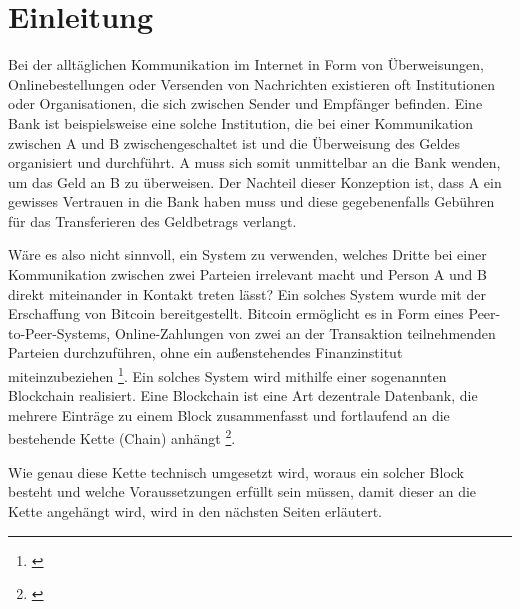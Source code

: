 \chapter*{Einleitung}

 Bei der alltäglichen Kommunikation im Internet in Form von 
 Überweisungen, Onlinebestellungen oder Versenden von Nachrichten 
 existieren oft Institutionen oder Organisationen, die sich
 zwischen Sender und Empfänger befinden. Eine Bank ist beispielsweise eine solche Institution, die bei einer Kommunikation zwischen A und B zwischengeschaltet ist und die Überweisung des Geldes organisiert und durchführt. A muss sich somit unmittelbar an die Bank wenden, um das Geld an B zu überweisen. Der Nachteil dieser Konzeption ist, dass A ein gewisses Vertrauen in die Bank haben muss und diese gegebenenfalls Gebühren für das Transferieren des Geldbetrags verlangt. 

 Wäre es also nicht sinnvoll, ein System zu verwenden, welches Dritte bei einer Kommunikation zwischen zwei Parteien irrelevant macht und Person A und B direkt miteinander in Kontakt treten lässt? Ein solches System wurde mit der Erschaffung von Bitcoin bereitgestellt. Bitcoin ermöglicht es in Form eines Peer-to-Peer-Systems, Online-Zahlungen von zwei an der Transaktion teilnehmenden Parteien durchzuführen, ohne ein außenstehendes Finanzinstitut miteinzubeziehen \footnote{\parencite{Satoshi.}}. Ein solches System wird mithilfe einer sogenannten Blockchain realisiert. Eine Blockchain ist eine Art dezentrale Datenbank, die mehrere Einträge zu einem Block zusammenfasst und fortlaufend an die bestehende Kette (Chain) anhängt \footnote{\parencite[vgl.][S. 17]{UK.}}.


Wie genau diese Kette technisch umgesetzt wird, woraus ein solcher Block besteht und welche Voraussetzungen erfüllt sein müssen, damit dieser an die Kette angehängt wird, wird in den nächsten Seiten erläutert.
